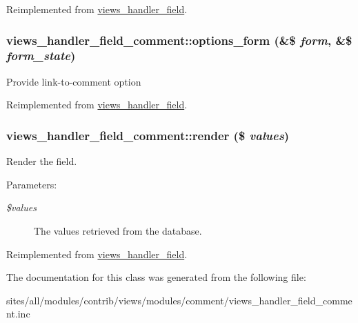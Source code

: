 Reimplemented from \hyperlink{classviews__handler__field_64c69a8a3697603f8283405071c25b76}{views\_\-handler\_\-field}.\hypertarget{classviews__handler__field__comment_5afe1cb8daaae349f0f39b9ce0195753}{
\subsubsection[{options\_\-form}]{\setlength{\rightskip}{0pt plus 5cm}views\_\-handler\_\-field\_\-comment::options\_\-form (\&\$ {\em form}, \/  \&\$ {\em form\_\-state})}}
\label{classviews__handler__field__comment_5afe1cb8daaae349f0f39b9ce0195753}


Provide link-to-comment option 

Reimplemented from \hyperlink{classviews__handler__field_0435d161922b7b4b84f02a2e79bb947a}{views\_\-handler\_\-field}.\hypertarget{classviews__handler__field__comment_c5e0fecfcd448920e3d837c1daed59fa}{
\subsubsection[{render}]{\setlength{\rightskip}{0pt plus 5cm}views\_\-handler\_\-field\_\-comment::render (\$ {\em values})}}
\label{classviews__handler__field__comment_c5e0fecfcd448920e3d837c1daed59fa}


Render the field.

\begin{Desc}
\item[Parameters:]
\begin{description}
\item[{\em \$values}]The values retrieved from the database. \end{description}
\end{Desc}


Reimplemented from \hyperlink{classviews__handler__field_82ff951c5e9ceb97b2eab86f880cbc1e}{views\_\-handler\_\-field}.

The documentation for this class was generated from the following file:\begin{CompactItemize}
\item 
sites/all/modules/contrib/views/modules/comment/views\_\-handler\_\-field\_\-comment.inc\end{CompactItemize}
